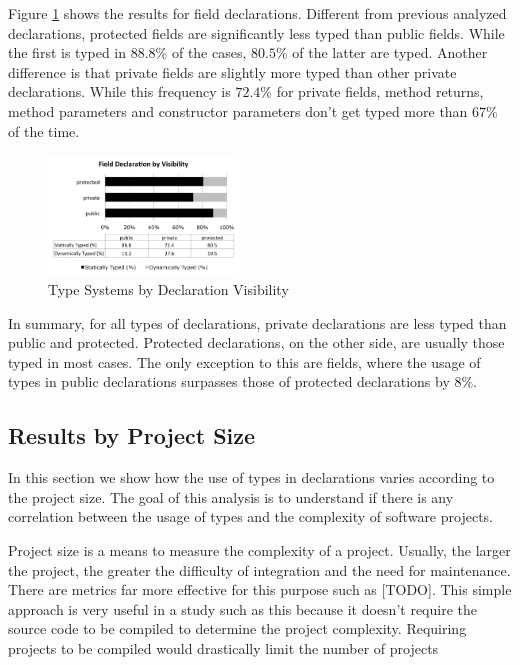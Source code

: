 \documentclass[preprint]{sigplanconf}
\begin{document}
Figure \ref{fig:field_visibility} shows the results for field declarations. 
Different from previous analyzed declarations, protected fields are significantly less typed than public fields. 
While the first is typed in $88.8\%$ of the cases, $80.5\%$ of the latter are typed.
Another difference is that private fields are slightly more typed than other private declarations.
While this frequency is $72.4\%$ for private fields, method returns, method parameters and constructor parameters don't get typed more than $67\%$ of the time.


\begin{figure}[ht]
\centering \includegraphics[width=0.45\textwidth]{images/field_visibility} 
\caption{Type Systems by Declaration Visibility}
\label{fig:field_visibility} 
\end{figure}

In summary, for all types of declarations, private declarations are less typed than public and protected.
Protected declarations, on the other side, are usually those typed in most cases. The only exception to this are fields, where the usage of types in public declarations surpasses those of protected declarations by $8\%$.

\subsection{Results by Project Size\label{sub:size-results}}
In this section we show how the use of types in declarations varies according to the project size. 
The goal of this analysis is to understand if there is any correlation between the usage of types and the complexity of software projects. 

Project size is a means to measure the complexity of a project.
Usually, the larger the project, the greater the difficulty of integration and the need for maintenance. 
There are metrics far more effective for this purpose such as [TODO].
This simple approach is very useful in a study such as this because it doesn't require the source code to be compiled to determine the project complexity. 
Requiring projects to be compiled would drastically limit the number of projects
\end{document}
